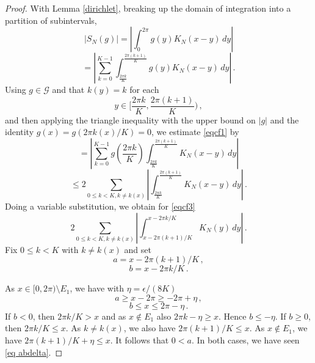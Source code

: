 \begin{proof}






    With Lemma \ref{dirichlet}, breaking up the domain of integration into a
    partition of subintervals,
    \begin{equation*}
        |S_N(g)|=|\int_{0}^{2\pi} g(y)K_N(x-y)\, dy|
    \end{equation*}
    \begin{equation}\label{eqcf1}
    =  |\sum_{k=0}^{K-1}\int_{\frac{2\pi k}K}^{\frac{2\pi (k+1)}K} g(y)K_N(x-y)\, dy|\, .
    \end{equation}
Using $g\in \mathcal{G}$ and that $ k(y)=k$ for each
\begin{equation}
    y\in [\frac {2\pi k}K, \frac{2\pi (k+1)}K)\, ,
\end{equation}
and then applying the triangle inequality with the upper bound on $|g|$ and the identity $g(x)=g(2\pi k(x)/K)=0$,  we estimate \eqref{eqcf1} by
        \begin{equation*}
    =  |\sum_{k=0}^{K-1} g(\frac{2\pi k}K) \int_{\frac{2\pi k}K}^{\frac{2\pi (k+1)}K} K_N(x-y)\, dy|
    \end{equation*}
        \begin{equation}\label{eqcf3}
    \le 2 \sum_{0\le k<K, k\neq k(x)} |\int_{\frac{2\pi k}K}^{\frac{2\pi (k+1)}K} K_N(x-y)\, dy|\, .
    \end{equation}
Doing a variable substitution, we obtain for \eqref{eqcf3}
\begin{equation}
    2 \sum_{0\le k<K, k\neq k(x)}
    |\int_{x-2\pi (k+1)/K}^{x-2\pi k/K} K_N(y)\, dy|\, .
\end{equation}
Fix $0\le k<K$ with $k\neq k(x)$ and set
\begin{equation}
    a=x-2\pi (k+1)/K\, ,
\end{equation}
\begin{equation}
    b=x-2\pi k/K\, .
\end{equation}



As $x\in [0,2\pi)\setminus E_1$, we have
with $\eta=\epsilon/(8K)$
\begin{equation}
    a\ge x-2\pi\ge -2\pi+\eta\, ,
\end{equation}
\begin{equation}
    b\le x \le 2\pi -\eta\, .
\end{equation}
If $b< 0$, then $2\pi k/K> x$ and as $x\not \in E_1$ also
$2\pi k-\eta \ge x$. Hence $b \le -\eta $. If $b\ge 0$, then $2\pi k/K\le x$. As $k\neq k(x)$, we also have
$2\pi (k+1)/K\le x$. As $x\not \in E_1$, we have
$2\pi (k+1)/K+\eta \le x$. It follows that
$0<a$. In both cases, we have seen
\eqref{eq abdelta}.




\end{proof}
